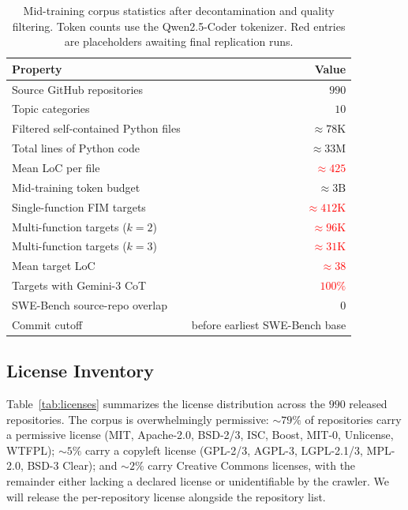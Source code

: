 \begin{table}[h]
\centering
\caption{Mid-training corpus statistics after decontamination and
quality filtering. Token counts use the Qwen2.5-Coder tokenizer.
Red entries are placeholders awaiting final replication runs.}
\label{tab:dataset}
\small
\setlength{\tabcolsep}{6pt}
\begin{tabular}{lr}
\toprule
Property & Value \\
\midrule
Source GitHub repositories                       & $990$ \\
Topic categories                                 & $10$ \\
Filtered self-contained Python files             & $\approx 78\mathrm{K}$ \\
Total lines of Python code                       & $\approx 33\mathrm{M}$ \\
Mean LoC per file                                & \textcolor{red}{$\approx 425$} \\
Mid-training token budget                        & $\approx 3\mathrm{B}$ \\
\midrule
Single-function FIM targets                      & \textcolor{red}{$\approx 412\mathrm{K}$} \\
Multi-function targets ($k{=}2$)                 & \textcolor{red}{$\approx 96\mathrm{K}$} \\
Multi-function targets ($k{=}3$)                 & \textcolor{red}{$\approx 31\mathrm{K}$} \\
Mean target LoC                                  & \textcolor{red}{$\approx 38$} \\
Targets with Gemini-3 CoT                        & \textcolor{red}{$100\%$} \\
\midrule
SWE-Bench source-repo overlap                    & $0$ \\
Commit cutoff                                    & before earliest SWE-Bench base \\
\bottomrule
\end{tabular}
\end{table}

\subsection{License Inventory}
\label{app:data:license}

Table~\ref{tab:licenses} summarizes the license distribution across the
$990$ released repositories. The corpus is overwhelmingly permissive:
$\sim\!79\%$ of repositories carry a permissive license (MIT,
Apache-2.0, BSD-2/3, ISC, Boost, MIT-0, Unlicense, WTFPL); $\sim\!5\%$
carry a copyleft license (GPL-2/3, AGPL-3, LGPL-2.1/3, MPL-2.0, BSD-3
Clear); and $\sim\!2\%$ carry Creative Commons licenses, with the
remainder either lacking a declared license or unidentifiable by the
crawler. We will release the per-repository license alongside the
repository list.

